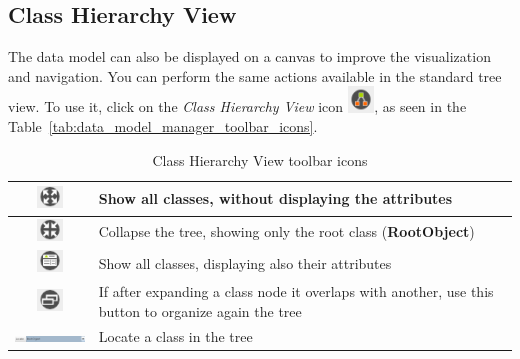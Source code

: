 \documentclass[a4paper]{article}
\begin{document}
		\subsection{Class Hierarchy View}
			The data model can also be displayed on a canvas to improve the visualization and navigation. You can perform the same actions available in the standard tree view. To use it, click on the \textit{Class Hierarchy View} icon \includegraphics[width=0.7cm]{img/icon_data_model_class_hierarchy_view.png}, as seen in the Table~\ref{tab:data_model_manager_toolbar_icons}.
			\begin{table}[h!]
				\centering
				\begin{tabular}{cp{10cm}}
					\includegraphics[width=0.7cm]{img/icon_expand_all.png} & Show all classes, without displaying the attributes\\
					\midrule
					\includegraphics[width=0.7cm]{img/icon_collapse_all.png} & Collapse the tree, showing only the root class (\textbf{RootObject})\\
					\midrule
					\includegraphics[width=0.7cm]{img/icon_expand_all_with_attributes.png} & Show all classes, displaying also their attributes\\
					\midrule
					\includegraphics[width=0.7cm]{img/icon_organize.png} & If after expanding a class node it overlaps with another, use this button to organize again the tree\\
					\midrule
					\includegraphics[width=3cm]{img/data_model_manager_locate.png} & Locate a class in the tree\\
				\end{tabular}
				\caption{Class Hierarchy View toolbar icons}
				\label{tab:class_hierarchy_view_icons}
			\end{table}
			
\end{document}
